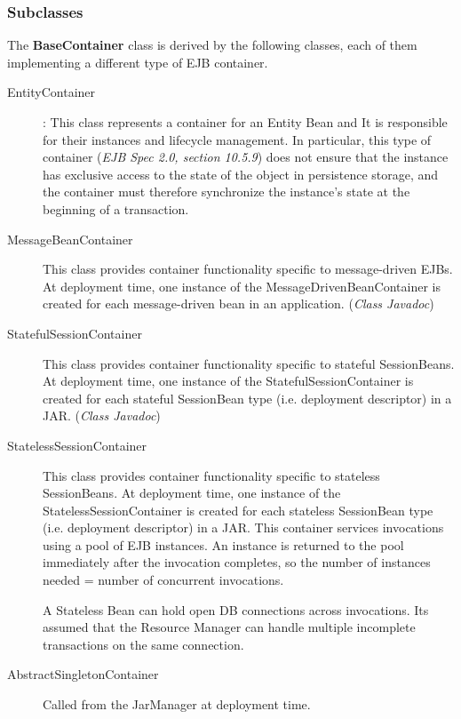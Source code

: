 \documentclass[11pt, a4paper,titlepage]{article}
\begin{document}
	 \subsubsection{Subclasses}
	  The \textbf{BaseContainer} class is derived by the following classes, each of them implementing a different type of EJB container.
	  \begin{description}
		  \item[EntityContainer]: This class represents a container for an Entity Bean and It is responsible for their instances and lifecycle management. In particular, this type of container (\textit{EJB Spec 2.0, section 10.5.9}) does not ensure that the instance has exclusive access to the state of the object in persistence storage, and the container must therefore synchronize the instance's state at the beginning of a transaction. 
		  \item[MessageBeanContainer]
		  This class provides container functionality specific to message-driven EJBs. At deployment time, one instance of the MessageDrivenBeanContainer is created for each message-driven bean in an application. (\textit{Class Javadoc})
		  \item[StatefulSessionContainer]
		  This class provides container functionality specific to stateful SessionBeans. At deployment time, one instance of the StatefulSessionContainer is created for each stateful SessionBean type (i.e. deployment descriptor) in a JAR. (\textit{Class Javadoc})
		  \item[StatelessSessionContainer]
		  This class provides container functionality specific to stateless SessionBeans. At deployment time, one instance of the StatelessSessionContainer is created for each stateless SessionBean type (i.e. deployment descriptor) in a JAR. \newline
		  This container services invocations using a pool of EJB instances. An instance is returned to the pool immediately after the invocation completes, so the number of instances needed = number of concurrent invocations.
		  
		  A Stateless Bean can hold open DB connections across invocations. Its assumed that the Resource Manager can handle multiple incomplete transactions on the same connection.
		  
		  \item[AbstractSingletonContainer] Called from the JarManager at deployment time.
	  \end{description}
\end{document}
